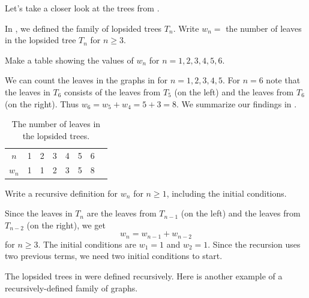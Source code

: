 Let's take a closer look at the trees from .

\begin{exam}
\label{exam_lopsided_trees}
    In , we defined the family of lopsided trees $T_n$.  Write $w_n=$ the number of leaves in the lopsided tree $T_n$ for $n \ge 3$.
        \begin{apart}
            \item Make a table showing the values of $w_n$ for $n=1,2,3,4,5,6$.
                \begin{soln}
                    We can count the leaves in the graphs in  for $n=1,2,3,4,5$.  For $n=6$ note that the leaves in $T_6$ consists of the leaves from $T_5$ (on the left) and the leaves from $T_6$ (on the right).  Thus $w_6 = w_5 + w_4 = 5+3=8$.  We summarize our findings in .
                \end{soln}
                \begin{table}[hbtp]
                    \centering
                    \begin{tabular}{c|c|c|c|c|c|c|c}
                        $n$ & 1 & 2 & 3 & 4 & 5 & 6 \\
                        $w_n$ & 1 & 1 & 2 & 3 & 5 & 8 
                    \end{tabular}
                    \caption{The number of leaves in the lopsided trees.}
                    \label{tab_leaves_lopsided}
                \end{table}
            \item Write a recursive definition for $w_n$ for $n \ge 1$, including the initial conditions.
                \begin{soln}
                    Since the leaves in $T_n$ are the leaves from $T_{n-1}$ (on the left) and the leaves from $T_{n-2}$ (on the right), we get 
                        $$w_n=w_{n-1}+w_{n-2}$$
                    for $n \ge 3$.  The initial conditions are $w_1=1$ and $w_2=1$.  Since the recursion uses two previous terms, we need two initial conditions to start.
                \end{soln}
        \end{apart}
\end{exam}

The lopsided trees in  were defined recursively.  Here is another example of a recursively-defined family of graphs.

